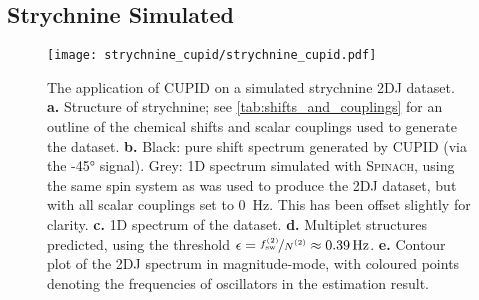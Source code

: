 
\subsection{Strychnine Simulated}
\label{subsec:strychnine-cupid}

\begin{figure}
    \texttt{[image: strychnine\_cupid/strychnine\_cupid.pdf]}
    \caption[
        The application of \acs{CUPID} on a simulated strychnine \acs{2DJ}
        dataset.
    ]
    {
        The application of \ac{CUPID} on a simulated strychnine \ac{2DJ} dataset.
        \textbf{a.} Structure of strychnine; see \cref{tab:shifts_and_couplings}
        for an outline of the chemical shifts and scalar couplings used to
        generate the dataset.
        \textbf{b.} Black: pure shift spectrum generated by \ac{CUPID} (via the
        \ang{-45} signal).
        Grey: \ac{1D} spectrum simulated with \textsc{Spinach}, using the same spin
        system as was used to produce the \ac{2DJ} dataset, but with all scalar
        couplings set to \qty{0}{\hertz}. This has been offset slightly for
        clarity.
        \textbf{c.} \ac{1D} spectrum of the dataset.
        \textbf{d.} Multiplet structures predicted, using the threshold $\epsilon
        = \nicefrac{\fswtwo}{\Ntwo} \approx \qty{0.39}{\hertz}$.
        \textbf{e.} Contour plot of the \ac{2DJ} spectrum in magnitude-mode,
        with coloured points denoting the frequencies of oscillators in the
        estimation result.
    }
    \label{fig:strychnine-cupid}
\end{figure}

